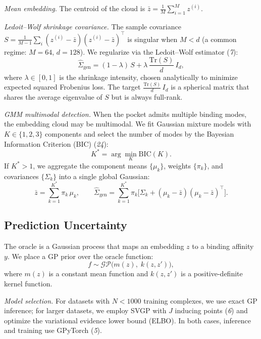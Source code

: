 \documentclass{article}
\newcommand{\Siggen}{\hat{\Sigma}_{\mathrm{gen}}}
\newcommand{\zbar}{\bar{z}}
\newcommand{\Tr}{\mathrm{Tr}}
\newcommand{\scite}[1]{(\textit{#1})}
\begin{document}
\textit{Mean embedding.}
The centroid of the cloud is $\zbar = \frac{1}{M}\sum_{i=1}^{M}z^{(i)}$.

\textit{Ledoit--Wolf shrinkage covariance.}
The sample covariance $S = \frac{1}{M-1}\sum_{i}(z^{(i)}-\zbar)
(z^{(i)}-\zbar)^{\!\top}$ is singular when $M < d$ (a common regime:
$M = 64$, $d = 128$).  We regularize via the Ledoit--Wolf
estimator \scite{7}:
\begin{equation}
  \Siggen = (1 - \lambda)\,S
            + \lambda\,\frac{\Tr(S)}{d}\,I_{d},
  \label{eq:lw}
\end{equation}
where $\lambda \in [0,1]$ is the shrinkage intensity, chosen
analytically to minimize expected squared Frobenius loss.  The target
$\frac{\Tr(S)}{d}\,I_{d}$ is a spherical matrix that shares the average
eigenvalue of $S$ but is always full-rank.

\textit{GMM multimodal detection.}
When the pocket admits multiple binding modes, the embedding cloud may be
multimodal.  We fit Gaussian mixture models with $K \in \{1,2,3\}$
components and select the number of modes by the Bayesian Information
Criterion (BIC) \scite{24}:
\begin{equation}
  K^{*} = \arg\min_{K} \mathrm{BIC}(K).
  \label{eq:bic}
\end{equation}
If $K^{*} > 1$, we aggregate the component means $\{\mu_{k}\}$, weights
$\{\pi_{k}\}$, and covariances $\{\Sigma_{k}\}$ into a single global
Gaussian:
\begin{equation}
  \zbar = \sum_{k=1}^{K^{*}} \pi_{k}\,\mu_{k},
  \qquad
  \Siggen = \sum_{k=1}^{K^{*}} \pi_{k}
            \bigl[\Sigma_{k} + (\mu_{k}-\zbar)(\mu_{k}-\zbar)^{\!\top}\bigr].
  \label{eq:gmm_agg}
\end{equation}

\subsection{Prediction Uncertainty}

The oracle is a Gaussian process that maps an embedding $z$ to a binding
affinity $y$.  We place a GP prior over the oracle function:
\begin{equation}
  f \sim \mathcal{GP}\!\bigl(m(z),\;k(z,z')\bigr),
  \label{eq:gp_prior}
\end{equation}
where $m(z)$ is a constant mean function and $k(z,z')$ is a positive-definite
kernel function.

\textit{Model selection.}
For datasets with $N < 1000$ training complexes, we use exact GP
inference; for larger datasets, we employ SVGP with $J$ inducing
points \scite{6} and optimize the variational evidence lower bound
(ELBO).  In both cases, inference and training use GPyTorch \scite{5}.
\end{document}
